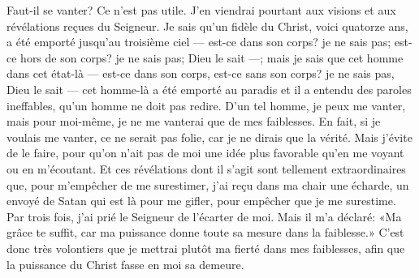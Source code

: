 Faut-il se vanter? Ce n’est pas utile.
J’en viendrai pourtant aux visions et aux révélations reçues du Seigneur.
Je sais qu’un fidèle du Christ, voici quatorze ans, a été emporté jusqu’au troisième ciel
	--- est-ce dans son corps? je ne sais pas;
	est-ce hors de son corps? je ne sais pas; Dieu le sait ---;
	mais je sais que cet homme dans cet état-là
	--- est-ce dans son corps, est-ce sans son corps?
	je ne sais pas, Dieu le sait ---
	cet homme-là a été emporté au paradis
	et il a entendu des paroles ineffables, qu’un homme ne doit pas redire.
D’un tel homme, je peux me vanter,
	mais pour moi-même, je ne me vanterai que de mes faiblesses.
En fait, si je voulais me vanter, ce ne serait pas folie,
	car je ne dirais que la vérité.
Mais j’évite de le faire,
	pour qu’on n’ait pas de moi une idée plus favorable
		qu’en me voyant ou en m’écoutant.
Et ces révélations dont il s’agit sont tellement extraordinaires
	que, pour m’empêcher de me surestimer,
	j’ai reçu dans ma chair une écharde,
	un envoyé de Satan qui est là pour me gifler,
	pour empêcher que je me surestime.
Par trois fois, j’ai prié le Seigneur de l’écarter de moi.
Mais il m’a déclaré: «Ma grâce te suffit,
	car ma puissance donne toute sa mesure dans la faiblesse.»
C’est donc très volontiers que je mettrai plutôt ma fierté dans mes faiblesses,
	afin que la puissance du Christ fasse en moi sa demeure.